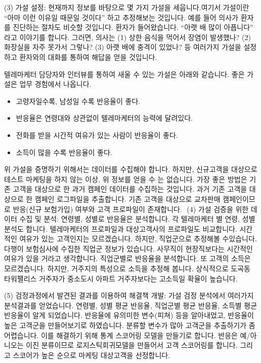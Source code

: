 \documentclass[letterpaper,10pt,english]{jupyterBook}
\begin{document}
\sphinxAtStartPar
(3)  가설 설정: 현재까지 정보를 바탕으로 몇 가지 가설을 세웁니다.​ 여기서 가설이란 “아마 이런 이유일 때문일 것이다” 하고 추정해보는 것입니다. 예를 들어 의사가 환자를 진단하는 절차도 비슷할 것입니다. 환자가 들어왔습니다. “아랫 배 많이 아픕니다” 라고 이야기를 합니다. 그러면, 의사는 (1) 상한 음식을 먹어서 장염이 발생했나? (2) 화장실을 자주 못가서 그렇나? (3) 아랫 배에 충격이 있었나? 등 여러가지 가설을 설정하고 환자와의 대화를 통하여 해답을 얻을 것입니다.

\sphinxAtStartPar
텔레마케터 담당자와 인터뷰를 통하여 새울 수 있는 가설은 아래와 같습니다. 좋은 가설은 업무 경험에서 나옵니다.
\begin{itemize}
\item {} 
\sphinxAtStartPar
고령자일수록, 남성일 수록 반응율이 좋다.

\item {} 
\sphinxAtStartPar
반응율은 연령대와 상관없이 텔레마케터의 능력에 달려있다.

\item {} 
\sphinxAtStartPar
전화를 받을 시간적 여유가 있는 사람이 반응율이 좋다.

\item {} 
\sphinxAtStartPar
소득이 많을 수록 반응율이 좋다.

\end{itemize}

\sphinxAtStartPar
위 가설을 증명하기 위해서는 데이터를 수집해야 합니다. 하지만, 신규고객을 대상으로 테스트 마케팅을 하지 않는 이상, 위 정보를 얻을 수 는 없습니다. 가장 좋은 방법은 기존 고객을 대상으로 한 과거 캠페인 데이터를 수집하는 것입니다. 과거 기존 고객을 대상으로 한 캠페인 로그파일을 추출합니다. 기존 고객을 대상으로 교차판매 캠페인이므로 반응(신규 보험가입) 여부와 고객 프로파일이 존재합니다.
​
(4) 가설 검증을 위한 데이터 수집 및 분석:  연령별, 성별로 반응율은 분석합니다. 각 텔레마케터 별 연령, 성별 분석도 합니다. 텔레마케터의 프로파일과 대상고객사의 프로파일도 비교합니다. 시간적인 여유가 있는 고객인지는 모르겠습니다. 하지만, 직업군으로 추정해볼 수있습니다. 다행이 보험심사에 수집한 직업군 정보가 있습니다. 사무직이 현장직보다는 시간적인 여유가 있을 거라고 생각합니다. 직업군별로 반응율을 분석합니다. 또 고객의 소득은 모르겠습니다. 하지만, 거주지의 특성으로 소득을 추정해 봅니다. 상식적으로 도곡동 타워팰리스 거주자가 중소도시 아파트 거주자보다는 고소득일 확율이 높습니다.

\sphinxAtStartPar
(5) 검정과정에서 발견된 결과를 이용하여 해결책 개발: 가설 검정 분석에서 여러가지 분석결과를 얻었습니다. 연령별, 성별 평균 반응율, 직업군별 평균 반응율, 소득별 평균 반응율이 알게 되었습니다. 반응율에 유의미한 변수(피쳐) 등을 알아내었고, 반응율이 높은 고객군을 만들어보기로 하였습니다. 분류할 변수가 많아 고객군을 추출하기가 좀 어렵습니다. 이를 해결하기 위해 통계 스코어링 모델을 만들기로 합니다. 반응은 예/아니오는 이진 분류이므로 로지스틱회귀모델을 만들어서 고객 스코어링를 합니다. 그리고 스코어가 높은 순으로 마케팅 대상고객을 선정합니다.
\end{document}

